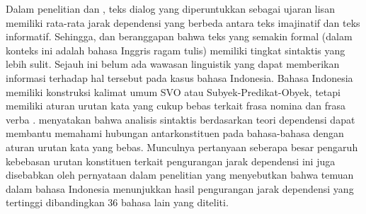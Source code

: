 Dalam penelitian \cite{hiranuma1999syntactic} dan \cite{liu2009chinese}, teks dialog yang diperuntukkan sebagai ujaran lisan memiliki rata-rata jarak dependensi yang berbeda antara teks imajinatif dan teks informatif. Sehingga, \cite{hiranuma1999syntactic} dan \cite{liu2009chinese} beranggapan bahwa teks yang semakin formal (dalam konteks ini adalah bahasa Inggris ragam tulis) memiliki tingkat sintaktis yang lebih sulit. Sejauh ini belum ada wawasan linguistik yang dapat memberikan informasi terhadap hal tersebut pada kasus bahasa Indonesia. Bahasa Indonesia memiliki konstruksi kalimat umum  SVO atau Subyek-Predikat-Obyek, tetapi memiliki aturan urutan kata yang cukup bebas terkait frasa nomina dan frasa verba \citep{irmawati2015dependency}. \cite{kubler2009dependency} menyatakan bahwa analisis sintaktis berdasarkan teori dependensi dapat membantu memahami hubungan antarkonstituen pada bahasa-bahasa dengan aturan urutan kata yang bebas. Munculnya pertanyaan seberapa besar pengaruh kebebasan urutan konstituen terkait pengurangan jarak dependensi ini juga disebabkan oleh pernyataan dalam penelitian \cite{futrell2015large} yang menyebutkan bahwa temuan dalam bahasa Indonesia menunjukkan hasil pengurangan jarak dependensi yang tertinggi dibandingkan 36 bahasa lain yang diteliti.


